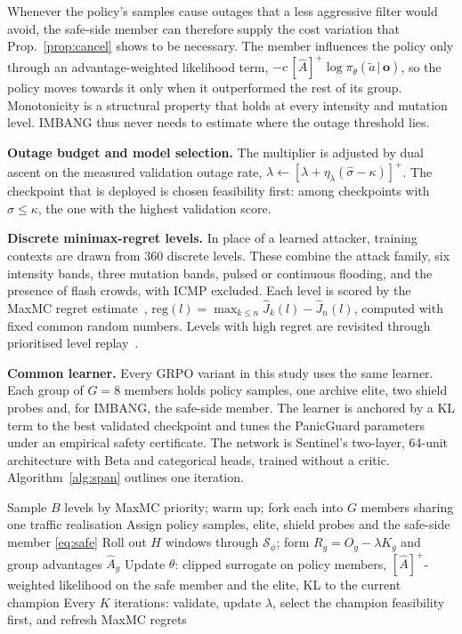 \documentclass[conference]{IEEEtran}
\begin{document}
Whenever the policy's samples cause outages that a less aggressive filter would avoid, the safe-side member can therefore supply the cost variation that Prop.~\ref{prop:cancel} shows to be necessary. The member influences the policy only through an advantage-weighted likelihood term, $-c\,[\hat A]^+\log\pi_\theta(\tilde a\,|\,\mathbf{o})$, so the policy moves towards it only when it outperformed the rest of its group. Monotonicity is a structural property that holds at every intensity and mutation level. IMBANG thus never needs to estimate where the outage threshold lies.

\textbf{Outage budget and model selection.} The multiplier is adjusted by dual ascent on the measured validation outage rate, $\lambda\leftarrow[\lambda+\eta_\lambda(\hat\sigma-\kappa)]^+$. The checkpoint that is deployed is chosen feasibility first: among checkpoints with $\hat\sigma\le\kappa$, the one with the highest validation score.

\textbf{Discrete minimax-regret levels.} In place of a learned attacker, training contexts are drawn from 360 discrete levels. These combine the attack family, six intensity bands, three mutation bands, pulsed or continuous flooding, and the presence of flash crowds, with ICMP excluded. Each level is scored by the MaxMC regret estimate~\cite{jiang2021robustplr}, $\mathrm{reg}(l)=\max_{k\le n}\hat J_k(l)-\hat J_n(l)$, computed with fixed common random numbers. Levels with high regret are revisited through prioritised level replay~\cite{jiang2021plr}.

\textbf{Common learner.} Every GRPO variant in this study uses the same learner. Each group of $G=8$ members holds policy samples, one archive elite, two shield probes and, for IMBANG, the safe-side member. The learner is anchored by a KL term to the best validated checkpoint and tunes the PanicGuard parameters under an empirical safety certificate. The network is Sentinel's two-layer, 64-unit architecture with Beta and categorical heads, trained without a critic. Algorithm~\ref{alg:span} outlines one iteration.

\begin{algorithm}[t]
\caption{One IMBANG training iteration}
\label{alg:span}
\small
\begin{algorithmic}[1]
\STATE Sample $B$ levels by MaxMC priority; warm up; fork each into $G$ members sharing one traffic realisation
\STATE Assign policy samples, elite, shield probes and the safe-side member \eqref{eq:safe}
\STATE Roll out $H$ windows through $\mathcal{S}_\phi$; form $R_g=O_g-\lambda K_g$ and group advantages $\hat A_g$
\STATE Update $\theta$: clipped surrogate on policy members, $[\hat A]^+$-weighted likelihood on the safe member and the elite, KL to the current champion
\STATE Every $K$ iterations: validate, update $\lambda$, select the champion feasibility first, and refresh MaxMC regrets
\end{algorithmic}
\end{algorithm}
\end{document}
